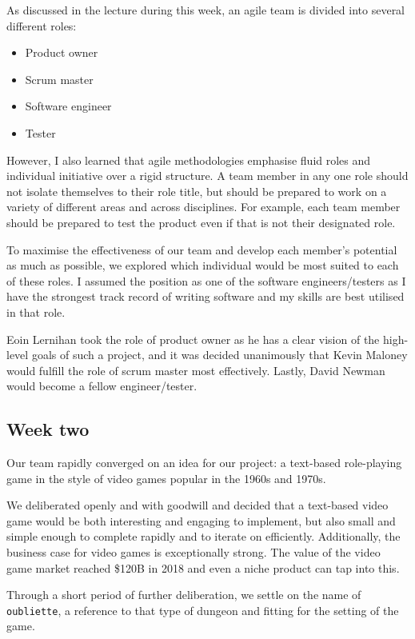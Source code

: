 \documentclass[12pt, a4]{article}
\begin{document}
As discussed in the lecture during this week, an agile team is divided into
several different roles:

\begin{itemize}
\item Product owner
\item Scrum master
\item Software engineer 
\item Tester
\end{itemize}

However, I also learned that agile methodologies emphasise fluid roles and
individual initiative over a rigid structure. A team member in any one role
should not isolate themselves to their role title, but should be prepared to
work on a variety of different areas and across disciplines. For example, each
team member should be prepared to test the product even if that is not their
designated role.

To maximise the effectiveness of our team and develop each member's potential
as much as possible, we explored which individual would be most suited to each
of these roles. I assumed the position as one of the software engineers/testers as
I have the strongest track record of writing software and my skills are best
utilised in that role.

Eoin Lernihan took the role of product owner as he has a clear vision of the
high-level goals of such a project, and it was decided unanimously that Kevin
Maloney would fulfill the role of scrum master most effectively. Lastly, David
Newman would become a fellow engineer/tester.

\subsection{Week two}
Our team rapidly converged on an idea for our project: a text-based role-playing
game in the style of video games popular in the 1960s and 1970s.

We deliberated openly and with goodwill and decided that a text-based video game
would be both interesting and engaging to implement, but also small and simple
enough to complete rapidly and to iterate on efficiently. Additionally, the
business case for video games is exceptionally strong. The value of the video
game market reached \$120B in 2018 \citep{superdata} and even a niche product
can tap into this.

Through a short period of further deliberation, we settle on the name of
\texttt{oubliette}, a reference to that type of dungeon and fitting for the
setting of the game.
\end{document}
